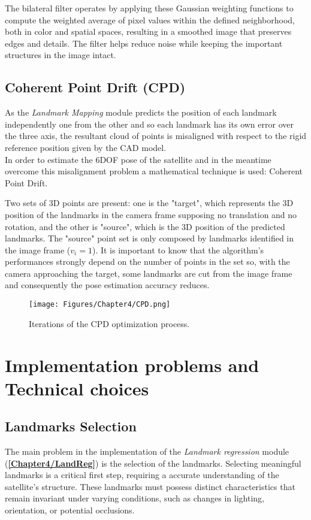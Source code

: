 The bilateral filter operates by applying these Gaussian weighting functions to compute the weighted average of pixel values within the defined neighborhood, both in color and spatial spaces, resulting in a smoothed image that preserves edges and details. The filter helps reduce noise while keeping the important structures in the image intact.

\subsection{Coherent Point Drift (CPD)}
\label{Chapter4/CPD}
As the \textit{Landmark Mapping} module predicts the position of each landmark independently one from the other and so each landmark has its own error over the three axis, the resultant cloud of points is misaligned with respect to the rigid reference position given by the CAD model.\\
In order to estimate the 6DOF pose of the satellite and in the meantime overcome this misalignment problem a mathematical technique is used: Coherent Point Drift.

Two sets of 3D points are present: one is the "target", which represents the 3D position of the landmarks in the camera frame supposing no translation and no rotation, and the other is "source", which is the 3D position of the predicted landmarks.
The "source" point set is only composed by landmarks identified in the image frame (\(v_i = 1\)). It is important to know that the algorithm's performances strongly depend on the number of points in the set so, with the camera approaching the target, some landmarks are cut from the image frame and consequently the pose estimation accuracy reduces.

\begin{figure}[H]
    \centering
    \texttt{[image: Figures/Chapter4/CPD.png]}
    \caption[Iterations of the CPD optimization process.]{Iterations of the CPD optimization process.}
    \label{fig:CPD}
\end{figure}

\section{Implementation problems and Technical choices }
\subsection{Landmarks Selection}
\label{Chapter4/LandmarksSel}
The main problem in the implementation of the \textit{Landmark regression} module (\textbf{\ref{Chapter4/LandReg}}) is the selection of the landmarks.
Selecting meaningful landmarks is a critical first step, requiring a accurate understanding of the satellite's structure. These landmarks must possess distinct characteristics that remain invariant under varying conditions, such as changes in lighting, orientation, or potential occlusions.

